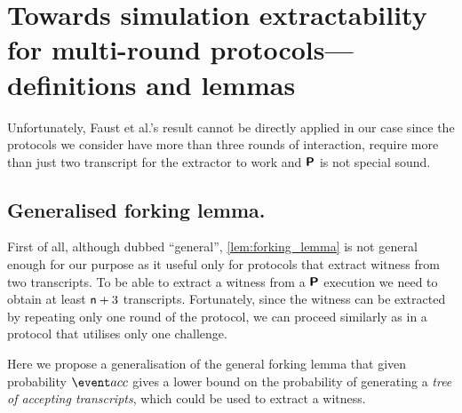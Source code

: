 \let\accentvec\vec \documentclass[runningheads,10pt]{llncs}
\begin{document}
\section{Towards simulation extractability for multi-round protocols---definitions and lemmas}
Unfortunately, Faust et al.'s result cannot be directly applied in our case since the protocols we consider have more than three rounds of interaction, require more than just two transcript for the extractor to work and $\bm{\mathsf{P}}$ is not special sound.

\subsection{Generalised forking lemma.}
First of all, although dubbed ``general'', \cref{lem:forking_lemma} is not general enough for our purpose as it useful only for protocols that extract witness from two transcripts. 
To be able to extract a witness from a $\bm{\mathsf{P}}$ execution we need to obtain at least $\mathsf{n} + 3$ transcripts.
Fortunately, since the witness can be extracted by repeating only one round of the protocol, we can proceed similarly as in a protocol that utilises only one challenge.

Here we propose a generalisation of the general forking lemma that given probability $\accProb$ gives a lower bound on the probability of generating a \emph{tree of accepting transcripts}, which could be used to extract a witness. 
\end{document}
